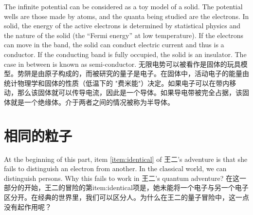 {    \tcblower

    The infinite potential can be considered as a toy model of a solid. The potential wells are those made by atoms, and the quanta being studied are the electrons. In solid, the energy of the active electrons is determined by statistical physics and the nature of the solid (the ``Fermi energy'' at low temperature). If the electrons can move in the band, the solid can conduct electric current and thus is a conductor. If the conducting band is fully occupied, the solid is an insulator. The case in between is known as semi-conductor. 
    无限电势可以被看作是固体的玩具模型。势阱是由原子构成的，而被研究的量子是电子。在固体中，活动电子的能量由统计物理学和固体的性质（低温下的 "费米能"）决定。如果电子可以在带内移动，那么该固体就可以传导电流，因此是一个导体。如果导电带被完全占据，该固体就是一个绝缘体。介于两者之间的情况被称为半导体。
}

\section{相同的粒子}

At the beginning of this part, item \ref{item:identical} of 王二's adventure is that she fails to distinguish an electron from another. In the classical world, we can distinguish persons. Why this fails to work in 王二's quantum adventure?
在这一部分的开始，王二的冒险的第{item:identical}项是，她未能将一个电子与另一个电子区分开。在经典的世界里，我们可以区分人。为什么在王二的量子冒险中，这一点没有起作用呢？

